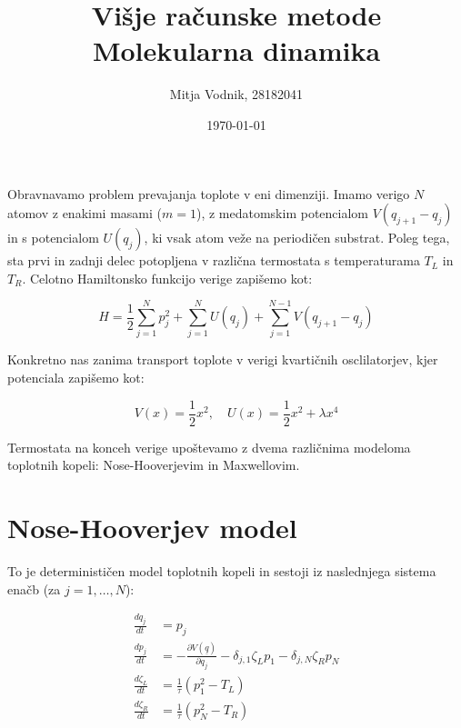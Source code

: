\documentclass[a4paper]{article}
\newcommand{\der}[2]{\frac{d#1}{d#2}}
\newcommand{\pder}[2]{\frac{\partial#1}{\partial#2}}
\newcommand{\half}{\frac{1}{2}}
\newcommand{\q}{\underline{q}}
\newcommand{\tinv}{\frac{1}{\tau}}
\begin{document}
    \title{\sc\large Višje računske metode\\
		\bigskip
		\bf\Large Molekularna dinamika}
	\author{Mitja Vodnik, 28182041}
	\date{\today}
	\maketitle

    Obravnavamo problem prevajanja toplote v eni dimenziji.
    Imamo verigo $N$ atomov z enakimi masami ($m = 1$), z medatomskim potencialom $V(q_{j+1} - q_j)$ in s potencialom
    $U(q_j)$, ki vsak atom veže na periodičen substrat.
    Poleg tega, sta prvi in zadnji delec potopljena v različna termostata s temperaturama $T_L$ in $T_R$.
    Celotno Hamiltonsko funkcijo verige zapišemo kot:

    \begin{equation}\label{eq1}
        H = \half \sum_{j=1}^{N} p_j^2 + \sum_{j=1}^N U(q_j) + \sum_{j=1}^{N-1} V(q_{j+1} - q_j)
    \end{equation}

    Konkretno nas zanima transport toplote v verigi kvartičnih osclilatorjev, kjer potenciala zapišemo kot:

    \begin{equation}\label{eq2}
        V(x) = \half x^2, \quad U(x) = \half x^2 + \lambda x^4
    \end{equation}

    Termostata na konceh verige upoštevamo z dvema različnima modeloma toplotnih kopeli: Nose-Hooverjevim in Maxwellovim.

    \section{Nose-Hooverjev model}

    To je determinističen model toplotnih kopeli in sestoji iz naslednjega sistema enačb (za $j = 1, \ldots, N$):

    \begin{equation}\label{eq3}
        \begin{split}
            \der{q_j}{t} &= p_j\\
            \der{p_j}{t} &= -\pder{V(\q)}{q_j} - \delta_{j,1}\zeta_L p_1 - \delta_{j,N}\zeta_R p_N\\
            \der{\zeta_L}{t} &= \tinv \left( p_1^2 - T_L \right)\\
            \der{\zeta_R}{t} &= \tinv \left( p_N^2 - T_R \right)
        \end{split}
    \end{equation}
\end{document}
